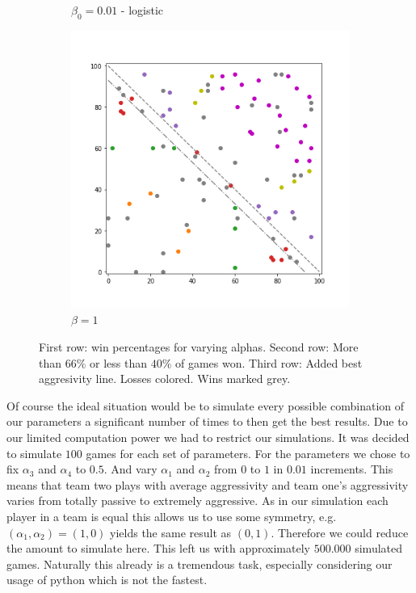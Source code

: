 \begin{figure}[!hb]
\begin{subfigure}{.3\textwidth}
	    \caption{$\beta_0=0.01$ - logistic}
    	\label{fig:26}
    \end{subfigure}%
	\begin{subfigure}{.3\textwidth}%
    	\centering
    	\includegraphics[width=1\linewidth]{Bilder/simulation_4_5}
    	\caption{$\beta=1$}
    	\label{fig:27}
	\end{subfigure}
	\caption{First row: win percentages for varying alphas. Second row: More than $66\%$ or less than $40\%$ of games won. Third row: Added best aggresivity line. Losses colored. Wins marked grey.}
\end{figure}

Of course the ideal situation would be to simulate every possible combination of our parameters a significant number of times to then get the best results. Due to our limited computation power we had to restrict our simulations. It was decided to simulate $100$ games for each set of parameters. For the parameters we chose to fix $\alpha_3$ and $\alpha_4$ to $0.5$. And vary $\alpha_1$ and $\alpha_2$ from $0$ to $1$ in $0.01$ increments. This means that team two plays with average aggressivity and team one’s aggressivity varies from totally passive to extremely aggressive. As in our simulation each player in a team is equal this allows us to use some symmetry, e.g. $(\alpha_1,\alpha_2) = (1,0)$ yields the same result as $(0,1)$. Therefore we could reduce the amount to simulate here. This left us with approximately $500.000$ simulated games. Naturally this already is a tremendous task, especially considering our usage of python which is not the fastest.

